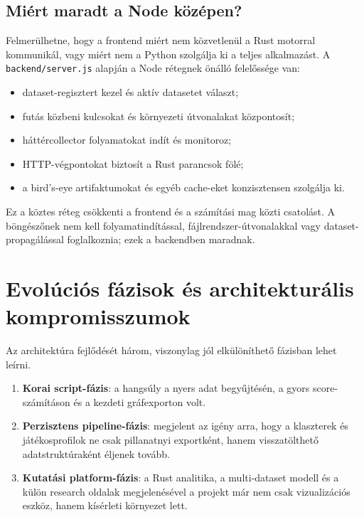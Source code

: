 \documentclass[a4paper,12pt]{report}
\begin{document}
\subsection{Miért maradt a Node középen?}

Felmerülhetne, hogy a frontend miért nem közvetlenül a Rust motorral kommunikál, vagy miért nem a Python szolgálja ki a teljes alkalmazást. A \texttt{backend/server.js} alapján a Node rétegnek önálló felelőssége van:

\begin{itemize}
    \item dataset-regisztert kezel és aktív datasetet választ;
    \item futás közbeni kulcsokat és környezeti útvonalakat központosít;
    \item háttércollector folyamatokat indít és monitoroz;
    \item HTTP-végpontokat biztosít a Rust parancsok fölé;
    \item a bird's-eye artifaktumokat és egyéb cache-eket konzisztensen szolgálja ki.
\end{itemize}

Ez a köztes réteg csökkenti a frontend és a számítási mag közti csatolást. A böngészőnek nem kell folyamatindítással, fájlrendszer-útvonalakkal vagy dataset-propagálással foglalkoznia; ezek a backendben maradnak.

\section{Evolúciós fázisok és architekturális kompromisszumok}

Az architektúra fejlődését három, viszonylag jól elkülöníthető fázisban lehet leírni.

\begin{enumerate}
    \item \textbf{Korai script-fázis}: a hangsúly a nyers adat begyűjtésén, a gyors score-számításon és a kezdeti gráfexporton volt.
    \item \textbf{Perzisztens pipeline-fázis}: megjelent az igény arra, hogy a klaszterek és játékosprofilok ne csak pillanatnyi exportként, hanem visszatölthető adatstruktúraként éljenek tovább.
    \item \textbf{Kutatási platform-fázis}: a Rust analitika, a multi-dataset modell és a külön research oldalak megjelenésével a projekt már nem csak vizualizációs eszköz, hanem kísérleti környezet lett.
\end{enumerate}
\end{document}
